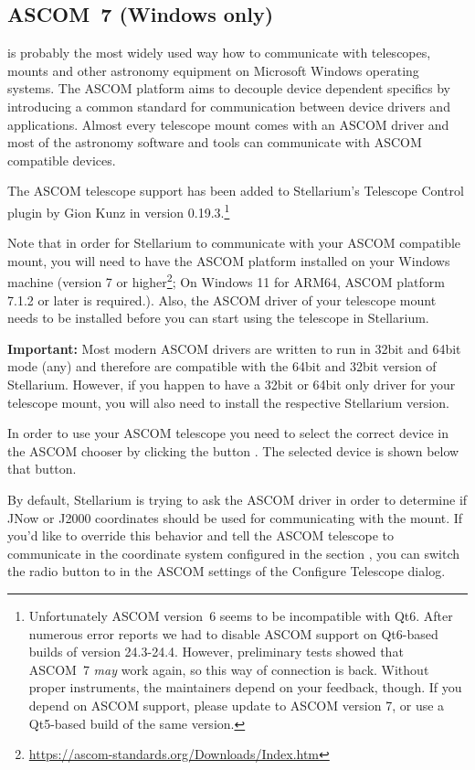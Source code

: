 \subsection{ASCOM~7 (Windows only)}
\label{sec:plugins:TelescopeControl:ASCOM}

 is probably the most widely used
way how to communicate with telescopes, mounts and other astronomy
equipment on Microsoft Windows operating systems. The ASCOM platform
aims to decouple device dependent specifics by introducing a common
standard for communication between device drivers and
applications. Almost every telescope mount comes with an ASCOM driver
and most of the astronomy software and tools can communicate with
ASCOM compatible devices.

The ASCOM telescope support has been added to Stellarium's Telescope Control plugin by Gion Kunz in version 0.19.3.\footnote{%
Unfortunately ASCOM version~6 seems to be incompatible with Qt6. 
After numerous error reports we had to disable ASCOM support on Qt6-based builds of version 24.3-24.4. 
However, preliminary tests showed that ASCOM~7 \emph{may} work again, so this way of connection is back. 
Without proper instruments, the maintainers depend on your feedback, though. 
If you depend on ASCOM support, please update to ASCOM version 7, or use a Qt5-based build of the same version.}

Note that in order for Stellarium to communicate with your ASCOM
compatible mount, you will need to have the ASCOM platform installed
on your Windows machine (version 7 or
higher\footnote{\url{https://ascom-standards.org/Downloads/Index.htm}}; 
On Windows 11 for ARM64, ASCOM platform 7.1.2 or later is required.). Also,
the ASCOM driver of your telescope mount needs to be installed before
you can start using the telescope in Stellarium.

\textbf{Important:} Most modern ASCOM drivers are written to run in 32bit and 64bit mode (any) and therefore are 
compatible with the 64bit and 32bit version of Stellarium. However, if you happen to have a 32bit or 64bit only
driver for your telescope mount, you will also need to install the respective Stellarium version.

In order to use your ASCOM telescope you need to select the correct device in the ASCOM chooser by clicking
the button . The selected device is shown below that button.

By default, Stellarium is trying to ask the ASCOM driver in order to determine if JNow or J2000 coordinates 
should be used for communicating with the mount. If you'd like to override this behavior and tell the ASCOM telescope
to communicate in the coordinate system configured in the section , you can
switch the radio button  to  in the ASCOM settings of 
the Configure Telescope dialog.

